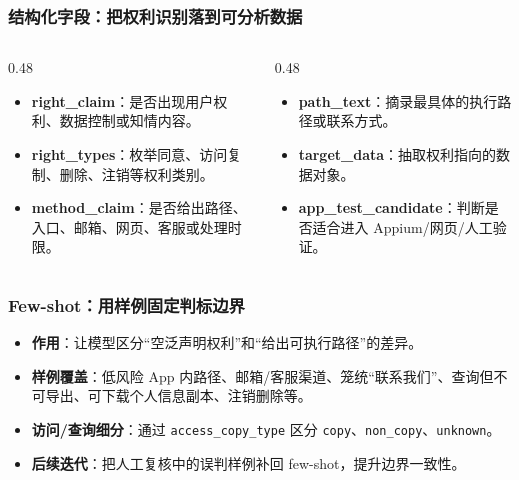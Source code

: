 \documentclass[AutoFakeBold,AutoFakeSlant]{beamer}
\begin{document}
\begin{frame}
    \frametitle{结构化字段：把权利识别落到可分析数据}
    \small
    \begin{columns}
        \begin{column}{0.48\textwidth}
            \begin{itemize}
                \item \textbf{right\_claim}：是否出现用户权利、数据控制或知情内容。
                \item \textbf{right\_types}：枚举同意、访问复制、删除、注销等权利类别。
                \item \textbf{method\_claim}：是否给出路径、入口、邮箱、网页、客服或处理时限。
            \end{itemize}
        \end{column}
        \begin{column}{0.48\textwidth}
            \begin{itemize}
                \item \textbf{path\_text}：摘录最具体的执行路径或联系方式。
                \item \textbf{target\_data}：抽取权利指向的数据对象。
                \item \textbf{app\_test\_candidate}：判断是否适合进入 Appium/网页/人工验证。
            \end{itemize}
        \end{column}
    \end{columns}
\end{frame}

\begin{frame}
    \frametitle{Few-shot：用样例固定判标边界}
    \small
    \begin{itemize}
        \item \textbf{作用}：让模型区分“空泛声明权利”和“给出可执行路径”的差异。
        \item \textbf{样例覆盖}：低风险 App 内路径、邮箱/客服渠道、笼统“联系我们”、查询但不可导出、可下载个人信息副本、注销删除等。
        \item \textbf{访问/查询细分}：通过 \texttt{access\_copy\_type} 区分 \texttt{copy}、\texttt{non\_copy}、\texttt{unknown}。
        \item \textbf{后续迭代}：把人工复核中的误判样例补回 few-shot，提升边界一致性。
    \end{itemize}
\end{frame}
\end{document}
